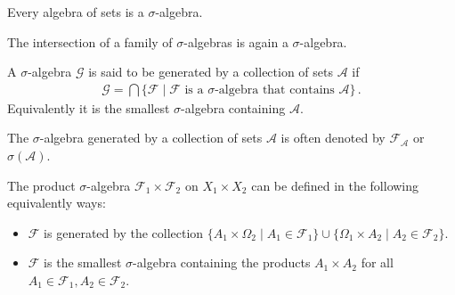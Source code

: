     \begin{result}
        Every algebra of sets is a $\sigma$-algebra.
    \end{result}

    \begin{property}[Intersections]
        The intersection of a family of $\sigma$-algebras is again a $\sigma$-algebra.
    \end{property}

    \begin{definition}\label{set:generated_sigma_algebra}
        A $\sigma$-algebra $\mathcal{G}$ is said to be generated by a collection of sets $\mathcal{A}$ if
        \begin{gather}
            \mathcal{G} = \bigcap\{\mathcal{F}\mid\mathcal{F}\text{ is a } \sigma\text{-algebra that contains }\mathcal{A}\}\,.
        \end{gather}
        Equivalently it is the smallest $\sigma$-algebra containing $\mathcal{A}$.
    \end{definition}
    \begin{notation}\label{set:notation:generated_sigma_algebra}
        The $\sigma$-algebra generated by a collection of sets $\mathcal{A}$ is often denoted by $\mathcal{F}_{\mathcal{A}}$ or $\sigma(\mathcal{A})$.
    \end{notation}

    \begin{definition}\label{set:product_of_sigma_algebras}
        The product $\sigma$-algebra $\mathcal{F}_1\times\mathcal{F}_2$ on $X_1\times X_2$ can be defined in the following equivalently ways:
        \begin{itemize}
            \item $\mathcal{F}$ is generated by the collection $\{A_1\times\Omega_2\mid A_1\in\mathcal{F}_1\}\cup\{\Omega_1\times A_2\mid A_2\in\mathcal{F}_2\}$.
            \item $\mathcal{F}$ is the smallest $\sigma$-algebra containing the products $A_1\times A_2$ for all $A_1\in\mathcal{F}_1, A_2\in\mathcal{F}_2$.
        \end{itemize}
    \end{definition}


